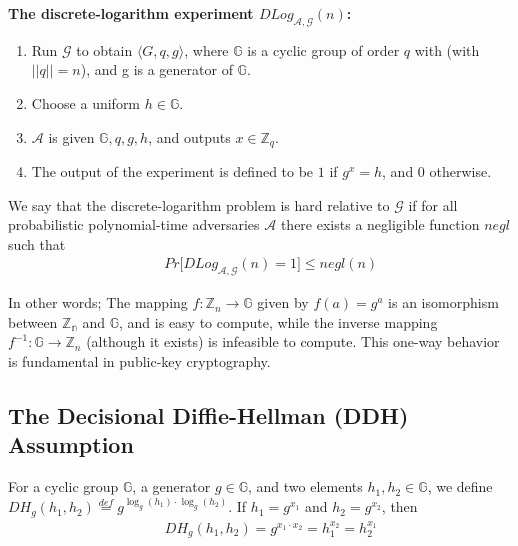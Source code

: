 \vspace{1em}
\noindent\textbf{The discrete-logarithm experiment $DLog_{\mathcal{A}, \mathcal{G}}(n)$:}
\begin{enumerate}

    \item Run $\mathcal{G}$ to obtain $\langle G,q,g \rangle$, where $\mathbb{G}$ is a cyclic group of order $q$ with (with $\lvert\lvert q \rvert \rvert = n$), and g is a generator of $\mathbb{G}$.
    
    \item Choose a uniform $h \in \mathbb{G}$.
    
    \item $\mathcal{A}$ is given $\mathbb{G}, q, g, h$, and outputs $x \in \mathbb{Z}_q$.
    
    \item The output of the experiment is defined to be $1$ if $g^x = h$, and $0$ otherwise.
    
\end{enumerate}

\begin{definition}
We say that the discrete-logarithm problem is hard relative to $\mathcal{G}$ if for all probabilistic polynomial-time adversaries $\mathcal{A}$ there exists a negligible function $negl$ such that %
\vspace{-.5em}
{\setlength{\mathindent}{0cm}
\begin{align*}
&&    Pr\big[ DLog_{\mathcal{A}, \mathcal{G}}(n) = 1 \big] \leq negl(n)
\end{align*}}
\end{definition}

In other words; The mapping $f: \mathbb{Z}_n \rightarrow \mathbb{G}$ given by $f(a) = g^a$ is an isomorphism between $\mathbb{Z_n}$ and $\mathbb{G}$, and is easy to compute, while the inverse mapping $f^{-1}: \mathbb{G} \rightarrow \mathbb{Z}_n$ (although it exists) is infeasible to compute. This one-way behavior is fundamental in public-key cryptography. 


\subsection{The Decisional Diffie-Hellman (DDH) Assumption}

For a cyclic group $\mathbb{G}$, a generator $g \in \mathbb{G}$, and two elements $h_1, h_2 \in \mathbb{G}$, we define $DH_g(h_1, h_2) \stackrel{def}{=} g^{\log_g(h_1) \cdot \log_g(h_2)}$. If $h_1 = g^{x_1}$ and $h_2 = g^{x_2}$, then 
\vspace{-1em}
{\setlength{\mathindent}{0cm}
\begin{align*}
    && DH_g(h_1, h_2) = g^{x_1 \cdot x_2} = h_1^{x_2} = h_2^{x_1}
\end{align*}}



